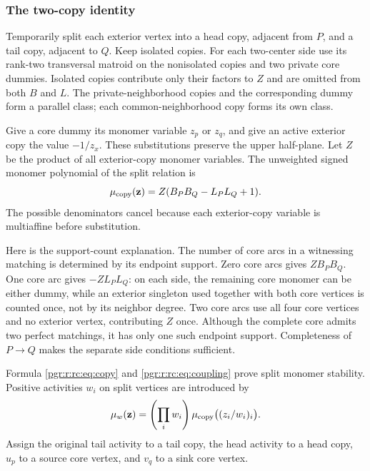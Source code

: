 \documentclass[11pt]{article}
\numberwithin{equation}{section}
\theoremstyle{definition}\newtheorem{definition}[theorem]{Definition}\newtheorem{remark}[theorem]{Remark}
\begin{document}
\subsubsection{The two-copy identity}
Temporarily split each exterior vertex into a head copy, adjacent from $P$, and a tail copy, adjacent to $Q$. Keep isolated copies. For each two-center side use its rank-two transversal matroid on the nonisolated copies and two private core dummies. Isolated copies contribute only their factors to $Z$ and are omitted from both $B$ and $L$. The private-neighborhood copies and the corresponding dummy form a parallel class; each common-neighborhood copy forms its own class.

Give a core dummy its monomer variable $z_p$ or $z_q$, and give an active exterior copy the value $-1/z_x$. These substitutions preserve the upper half-plane. Let $Z$ be the product of all exterior-copy monomer variables. The unweighted signed monomer polynomial of the split relation is
\begin{equation}\label{pgr:r:rc:eq:copy}
 \mu_{\rm copy}(\mathbf z)=Z(B_PB_Q-L_PL_Q+1).
\end{equation}
The possible denominators cancel because each exterior-copy variable is multiaffine before substitution.

Here is the support-count explanation. The number of core arcs in a witnessing matching is determined by its endpoint support. Zero core arcs gives $ZB_PB_Q$. One core arc gives $-ZL_PL_Q$: on each side, the remaining core monomer can be either dummy, while an exterior singleton used together with both core vertices is counted once, not by its neighbor degree. Two core arcs use all four core vertices and no exterior vertex, contributing $Z$ once. Although the complete core admits two perfect matchings, it has only one such endpoint support. Completeness of $P\to Q$ makes the separate side conditions sufficient.

Formula \eqref{pgr:r:rc:eq:copy} and \eqref{pgr:r:rc:eq:coupling} prove split monomer stability. Positive activities $w_i$ on split vertices are introduced by
\[
 \mu_w(\mathbf z)=\left(\prod_i w_i\right)
                  \mu_{\rm copy}\bigl((z_i/w_i)_i\bigr).
\]
Assign the original tail activity to a tail copy, the head activity to a head copy, $u_p$ to a source core vertex, and $v_q$ to a sink core vertex.
\end{document}
